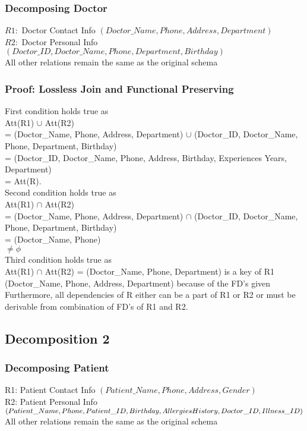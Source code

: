 \documentclass[12pt,arial]{article}
\begin{document}
\subsubsection{Decomposing Doctor}
$R1:$ Doctor Contact Info $(Doctor\_Name, Phone, Address, Department)$\\
$R2:$ Doctor Personal Info $(Doctor\_ID, Doctor\_Name, Phone, Department, Birthday)$ \\ \hfil \break
All other relations remain the same as the original schema
\subsubsection{Proof: Lossless Join and Functional Preserving}
First condition holds true as \\Att(R1) $\cup$ Att(R2) \\= (Doctor\_Name, Phone, Address, Department) $\cup$ (Doctor\_ID, Doctor\_Name, Phone, Department, Birthday) \\= (Doctor\_ID, Doctor\_Name, Phone, Address, Birthday, Experiences Years, Department) \\= Att(R).\\ \hfil \break
Second condition holds true as \\Att(R1) $\cap$  Att(R2) \\= (Doctor\_Name, Phone, Address, Department) $\cap$ (Doctor\_ID, Doctor\_Name, Phone, Department, Birthday) \\= (Doctor\_Name, Phone) \\$\neq \phi$\\ \hfil \break
Third condition holds true as \\Att(R1) $\cap$ Att(R2) = (Doctor\_Name, Phone, Department) is a key of R1 (Doctor\_Name, Phone, Address, Department) because of the FD's given\\ \hfil \break
Furthermore, all dependencies of R either can be a part of R1 or R2 or must be derivable from combination of FD’s of R1 and R2.\\ \hfil \break
\subsection{Decomposition 2}
\subsubsection{Decomposing Patient}
R1: Patient Contact Info $(Patient\_Name, Phone, Address,Gender)$\\
R2: Patient Personal Info $(Patient\_Name, Phone, Patient\_ID, \\Birthday, Allergies History, Doctor\_ID, Illness\_ID)$\\ \hfil \break
All other relations remain the same as the original schema
\end{document}
